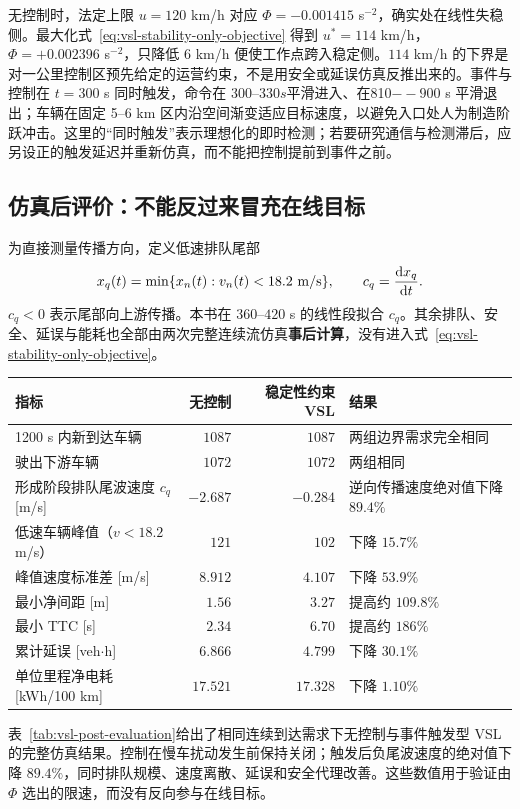 \documentclass[11pt,a4paper,openany]{book}
\numberwithin{equation}{chapter}
\numberwithin{figure}{chapter}
\numberwithin{table}{chapter}
\newcommand{\tabletext}[2]{%
  \par\smallskip\noindent
  表~\ref{#1}给出了#2
  \par\smallskip
}
\begin{document}
无控制时，法定上限 $u=120$ km/h 对应 $\Phi=-0.001415$ s$^{-2}$，确实处在线性失稳侧。最大化式~\eqref{eq:vsl-stability-only-objective} 得到 $u^*=114$ km/h，$\Phi=+0.002396$ s$^{-2}$，只降低 $6$ km/h 便使工作点跨入稳定侧。$114$ km/h 的下界是对一公里控制区预先给定的运营约束，不是用安全或延误仿真反推出来的。事件与控制在 $t=300$ s 同时触发，命令在 $300$--330$ s 平滑进入、在 $810$--900$ s 平滑退出；车辆在固定 5--6 km 区内沿空间渐变适应目标速度，以避免入口处人为制造阶跃冲击。这里的“同时触发”表示理想化的即时检测；若要研究通信与检测滞后，应另设正的触发延迟并重新仿真，而不能把控制提前到事件之前。

\subsection{仿真后评价：不能反过来冒充在线目标}

为直接测量传播方向，定义低速排队尾部
\begin{equation}
x_q(t)=\min\{x_n(t):v_n(t)<18.2~{\rm m/s}\},
\qquad c_q=\frac{{\rm d}x_q}{{\rm d}t}.
\label{eq:vsl-queue-tail-speed}
\end{equation}
$c_q<0$ 表示尾部向上游传播。本书在 $360$--$420$ s 的线性段拟合 $c_q$。其余排队、安全、延误与能耗也全部由两次完整连续流仿真\textbf{事后计算}，没有进入式~\eqref{eq:vsl-stability-only-objective}。

\begin{center}
\small
{}
\label{tab:vsl-post-evaluation}
\begin{tabular}{p{4.2cm}rrp{4.4cm}}
\toprule
\textbf{指标} & \textbf{无控制} & \textbf{稳定性约束 VSL} & \textbf{结果} \\
\midrule
1200 s 内新到达车辆 & $1087$ & $1087$ & 两组边界需求完全相同 \\
驶出下游车辆 & $1072$ & $1072$ & 两组相同 \\
形成阶段排队尾波速度 $c_q$ [m/s] & $-2.687$ & $-0.284$ & 逆向传播速度绝对值下降 $89.4\%$ \\
低速车辆峰值（$v<18.2$ m/s） & $121$ & $102$ & 下降 $15.7\%$ \\
峰值速度标准差 [m/s] & $8.912$ & $4.107$ & 下降 $53.9\%$ \\
最小净间距 [m] & $1.56$ & $3.27$ & 提高约 $109.8\%$ \\
最小 TTC [s] & $2.34$ & $6.70$ & 提高约 $186\%$ \\
累计延误 [veh$\cdot$h] & $6.866$ & $4.799$ & 下降 $30.1\%$ \\
单位里程净电耗 [kWh/100 km] & $17.521$ & $17.328$ & 下降 $1.10\%$ \\
\bottomrule
\end{tabular}
\end{center}
\tabletext{tab:vsl-post-evaluation}{相同连续到达需求下无控制与事件触发型 VSL 的完整仿真结果。控制在慢车扰动发生前保持关闭；触发后负尾波速度的绝对值下降 $89.4\%$，同时排队规模、速度离散、延误和安全代理改善。这些数值用于验证由 $\Phi$ 选出的限速，而没有反向参与在线目标。}
\end{document}
